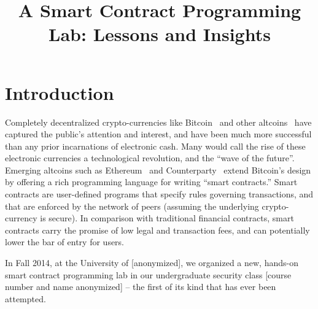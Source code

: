 \documentclass[10pt,twocolumn,letterpaper]{article}
\newcommand{\elaine}[1]{}
\begin{document}
\title{A Smart Contract Programming Lab: Lessons and Insights}

\date{}
\maketitle


\newpage
\section{Introduction}

Completely decentralized crypto-currencies like Bitcoin~\cite{satoshi-bitcoin}
and other altcoins~\cite{altcoins}
have captured the public's attention and interest, 
and have been much more successful than any prior incarnations of electronic
cash. Many would call the rise 
of these electronic currencies a technological revolution, and the ``wave of
the future''.
Emerging altcoins such as Ethereum~\cite{ethereum} and Counterparty~\cite{counterparty}
extend Bitcoin's design by offering a rich programming language for 
writing ``smart contracts.'' Smart
contracts are user-defined programs that specify rules 
governing transactions, and that are enforced by
the network of peers (assuming the underlying crypto-currency is secure). 
In comparison with traditional
financial contracts, smart contracts carry the promise of low legal 
and transaction fees, and can potentially
lower the bar of entry for users.

In Fall 2014, at the University of [anonymized], 
we organized a new, hands-on
smart contract programming lab in our undergraduate security
class [course number and name anonymized] -- the first of its
kind that has ever been attempted.



\end{document}
